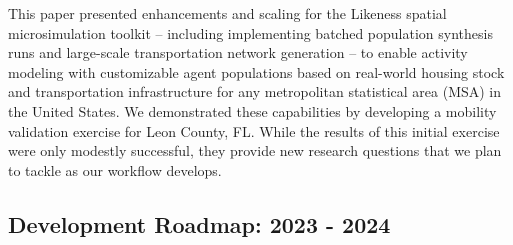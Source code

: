 This paper presented enhancements and scaling for the Likeness spatial microsimulation toolkit -- including implementing batched population synthesis runs and large-scale transportation network generation -- to enable activity modeling with customizable agent populations based on real-world housing stock and transportation infrastructure for any metropolitan statistical area (MSA) in the United States. We demonstrated these capabilities by developing a mobility validation exercise for Leon County, FL. While the results of this initial exercise were only modestly successful, they provide new research questions that we plan to tackle as our workflow develops. 

\subsection{Development Roadmap: 2023 - 2024} \label{section:dev-roadmap}

